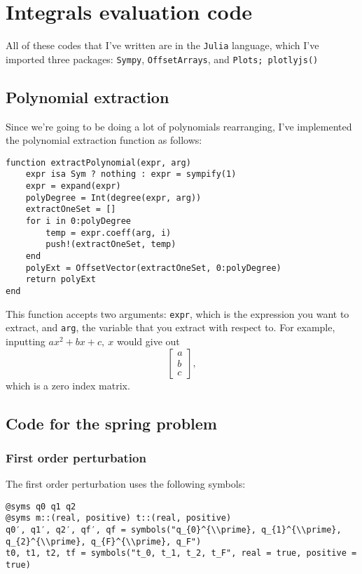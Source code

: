 \chapter{Integrals evaluation code}
\label{appendix:sympy_code_base}

All of these codes that I've written are in the \texttt{Julia} language, which I've imported three packages: \texttt{Sympy}, \texttt{OffsetArrays}, and \texttt{Plots; plotlyjs()}

\section{Polynomial extraction}

Since we're going to be doing a lot of polynomials rearranging, I've implemented the polynomial extraction function as follows:
\begin{verbatim}
function extractPolynomial(expr, arg)
    expr isa Sym ? nothing : expr = sympify(1)
    expr = expand(expr)
    polyDegree = Int(degree(expr, arg))
    extractOneSet = []
    for i in 0:polyDegree
        temp = expr.coeff(arg, i)
        push!(extractOneSet, temp)
    end
    polyExt = OffsetVector(extractOneSet, 0:polyDegree)
    return polyExt
end
\end{verbatim}
This function accepts two arguments: \texttt{expr}, which is the expression you want to extract, and \texttt{arg}, the variable that you extract with respect to. For example, inputting $ax^2 + bx + c,~x$ would give out
\begin{equation}
    \begin{bmatrix}
        a \\ b \\ c
    \end{bmatrix},
\end{equation}
which is a zero index matrix.

\section{Code for the spring problem}

\subsection{First order perturbation}

The first order perturbation uses the following symbols:
\begin{verbatim}
@syms q0 q1 q2
@syms m::(real, positive) t::(real, positive)
q0′, q1′, q2′, qf′, qf = symbols("q_{0}^{\\prime}, q_{1}^{\\prime}, q_{2}^{\\prime}, q_{F}^{\\prime}, q_F")
t0, t1, t2, tf = symbols("t_0, t_1, t_2, t_F", real = true, positive = true)
\end{verbatim}

